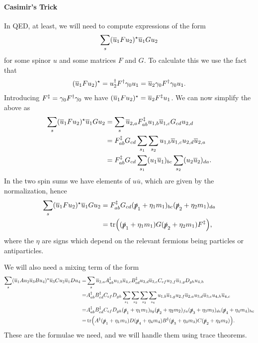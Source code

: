 \paragraph{Casimir's Trick}
In QED, at least, we will need to compute expressions of the form
\begin{align*}
	\sum\limits_{s}(\overline{u}_{1}Fu_{2})^{\star} \overline{u}_{1}Gu_{2}
\end{align*}
for some spinor $u$ and some matrices $F$ and $G$. To calculate this we use the fact that
\begin{align*}
	(\overline{u}_{1}Fu_{2})^{\star} = u_{2}^{\dagger} F^{\dagger}\gamma_{0}u_{1} = \overline{u}_{2}\gamma_{0}F^{\dagger}\gamma_{0}u_{1}.
\end{align*}
Introducing $F^{\ddagger} = \gamma_{0}F^{\dagger}\gamma_{0}$ we have $(\overline{u}_{1}Fu_{2})^{\star} = \overline{u}_{2}F^{\ddagger}u_{1}$. We can now simplify the above as
\begin{align*}
	\sum\limits_{s}(\overline{u}_{1}Fu_{2})^{\star} \overline{u}_{1}Gu_{2} &= \sum\limits_{s}\overline{u}_{2, a}F^{\ddagger}_{ab}u_{1, b}\overline{u}_{1, c}G_{cd}u_{2, d} \\
	&= F^{\ddagger}_{ab}G_{cd}\sum\limits_{s_{1}}\sum\limits_{s_{2}}u_{1, b}\overline{u}_{1, c}u_{2, d}\overline{u}_{2, a} \\
	&= F^{\ddagger}_{ab}G_{cd}\sum\limits_{s_{1}}(u_{1}\overline{u}_{1})_{bc}\sum\limits_{s_{2}}(u_{2}\overline{u}_{2})_{da}.
\end{align*}
In the two spin sums we have elements of $u\overline{u}$, which are given by the normalization, hence
\begin{align*}
	\sum\limits_{s}(\overline{u}_{1}Fu_{2})^{\star} \overline{u}_{1}Gu_{2} &= F^{\ddagger}_{ab}G_{cd}(\slashed{p}_{1} + \eta_{1}m_{1})_{bc}(\slashed{p}_{2} + \eta_{2}m_{1})_{da} \\
	&= \tr((\slashed{p}_{1} + \eta_{1}m_{1})G(\slashed{p}_{2} + \eta_{2}m_{1})F^{\ddagger}),
\end{align*}
where the $\eta$ are signs which depend on the relevant fermions being particles or antiparticles. 

We will also need a mixing term of the form
\begin{align*}
	\sum\limits_{s}(\overline{u}_{1}Au_{2}\overline{u}_{3}Bu_{4})^{\star}\overline{u}_{3}Cu_{2}\overline{u}_{1}Du_{4} =& \sum\limits_{s}\overline{u}_{2, a}A_{ab}^{\ddagger}u_{1, b}\overline{u}_{4, c}B_{cd}^{\ddagger}u_{3, d}\overline{u}_{3, e}C_{ef}u_{2, f}\overline{u}_{1, g}D_{gh}u_{4, h} \\
	=& A_{ab}^{\ddagger}B_{cd}^{\ddagger}C_{ef}D_{gh}\sum\limits_{s_{1}}\sum\limits_{s_{2}}\sum\limits_{s_{3}}\sum\limits_{s_{4}}u_{1, b}\overline{u}_{1, g}u_{2, f}\overline{u}_{2, a}u_{3, d}\overline{u}_{3, e}u_{4, h}\overline{u}_{4, c} \\
	=& A_{ab}^{\ddagger}B_{cd}^{\ddagger}C_{ef}D_{gh}(\slashed{p}_{1} + \eta_{1}m_{1})_{bg}(\slashed{p}_{2} + \eta_{2}m_{2})_{fa}(\slashed{p}_{3} + \eta_{3}m_{3})_{de}(\slashed{p}_{4} + \eta_{4}m_{4})_{hc} \\
	=& \tr(A^{\ddagger}(\slashed{p}_{1} + \eta_{1}m_{1})D(\slashed{p}_{4} + \eta_{4}m_{4})B^{\ddagger}(\slashed{p}_{3} + \eta_{3}m_{3})C(\slashed{p}_{2} + \eta_{2}m_{2})).
\end{align*}
These are the formulae we need, and we will handle them using trace theorems.

